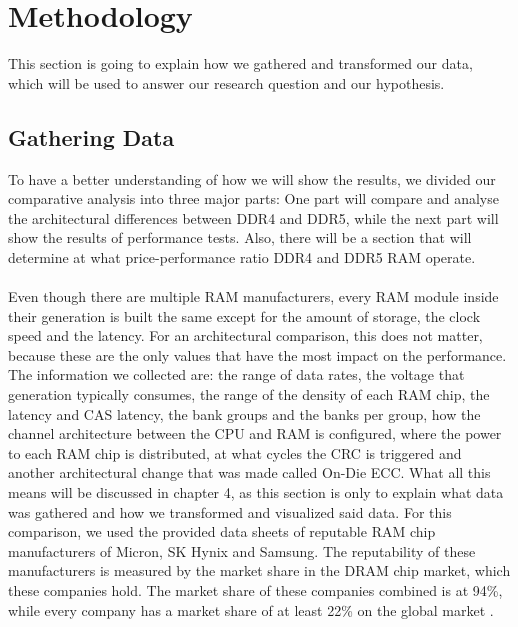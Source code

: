 \section{Methodology}

This section is going to explain how we gathered and transformed our data, which will be used to answer our research question and our hypothesis.

\subsection{Gathering Data}

To have a better understanding of how we will show the results, we divided our comparative analysis into three major parts: One part will compare and analyse the architectural differences between DDR4 and DDR5, while the next part will show the results of performance tests. Also, there will be a section that will determine at what price-performance ratio DDR4 and DDR5 RAM operate.
\\
\\
Even though there are multiple RAM manufacturers, every RAM module inside their generation is built the same except for the amount of storage, the clock speed and the latency. For an architectural comparison, this does not matter, because these are the only values that have the most impact on the performance. The information we collected are: the range of data rates, the voltage that generation typically consumes, the range of the density of each RAM chip, the latency and \gls{CAS} latency, the bank groups and the banks per group, how the channel architecture between the CPU and RAM is configured, where the power to each RAM chip is distributed, at what cycles the \gls{CRC} is triggered and another architectural change that was made called On-Die \gls{ECC}. What all this means will be discussed in chapter 4, as this section is only to explain what data was gathered and how we transformed and visualized said data. For this comparison, we used the provided data sheets of reputable RAM chip manufacturers of Micron, SK Hynix and Samsung. The reputability of these manufacturers is measured by the market share in the \gls{DRAM} chip market, which these companies hold. The market share of these companies combined is at 94\%, while every company has a market share of at least 22\% on the global market \parencite{marketshare}.
\\
\\
